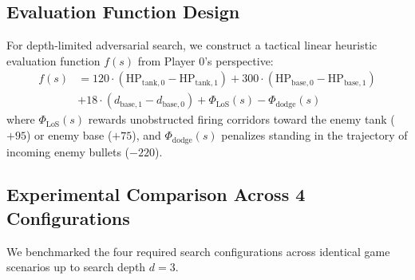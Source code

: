 \documentclass[conference]{IEEEtran}
\begin{document}
\subsection{Evaluation Function Design}
For depth-limited adversarial search, we construct a tactical linear heuristic evaluation function $f(s)$ from Player 0's perspective:
\begin{align}
    f(s) &= 120 \cdot (\text{HP}_{\text{tank}, 0} - \text{HP}_{\text{tank}, 1}) + 300 \cdot (\text{HP}_{\text{base}, 0} - \text{HP}_{\text{base}, 1}) \nonumber \\
         &+ 18 \cdot (d_{\text{base}, 1} - d_{\text{base}, 0}) + \Phi_{\text{LoS}}(s) - \Phi_{\text{dodge}}(s)
\end{align}
where $\Phi_{\text{LoS}}(s)$ rewards unobstructed firing corridors toward the enemy tank ($+95$) or enemy base ($+75$), and $\Phi_{\text{dodge}}(s)$ penalizes standing in the trajectory of incoming enemy bullets ($-220$).

\subsection{Experimental Comparison Across 4 Configurations}
We benchmarked the four required search configurations across identical game scenarios up to search depth $d=3$.
\end{document}
